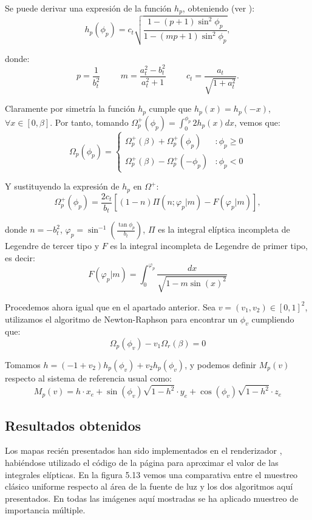 Se puede derivar una expresión de la función $h_p$, obteniendo (ver \cite{Guillen2017}):
$$h_p(\phi_p)=c_t\sqrt{\frac{1-(p+1)\sin^2\phi_p}{1-(mp+1)\sin^2\phi_p}},$$

donde:
$$p=\frac{1}{b_t^2} \hspace{1cm} m=\frac{a_t^2-b_t^2}{a_t^2+1} \hspace{1cm} c_t=\frac{a_t}{\sqrt{1+a_t^2}}.$$

Claramente por simetría la función $h_p$ cumple que $h_p(x) = h_p(-x)$, $\forall x \in [0,\beta]$. Por tanto, tomando $\Omega_p^+(\phi_p)=\int_0^{\phi_p}2h_p(x)dx$, vemos que:
\[ \Omega_p(\phi_p) =
   \begin{cases}
      \Omega_p^+(\beta)+\Omega_p^+(\phi_p) & :\phi_p\geq0 \\
      \Omega_p^+(\beta)-\Omega_p^+(-\phi_p) & :\phi_p <0
   \end{cases}
  \]

Y sustituyendo la expresión de $h_p$ en $\Omega^+$:
$$\Omega_p^+(\phi_p)=\frac{2c_t}{b_t}[(1-n)\Pi(n;\varphi_p|m)-F(\varphi_p|m)],$$

donde $n=-b_t^2$, $\varphi_p=\sin^{-1}(\frac{\tan\phi_p}{b_t})$, $\Pi$ es la integral elíptica incompleta de Legendre de tercer tipo y $F$ es la integral incompleta de Legendre de primer tipo, es decir:
$$F(\varphi_p | m) = \int_0^{\varphi_p}\frac{dx}{\sqrt{1-m\sin(x)^2}} $$

Procedemos ahora igual que en el apartado anterior. Sea $v=(v_1,v_2)\in[0,1]^2$, utilizamos el algoritmo de Newton-Raphson para encontrar un $\phi_v$ cumpliendo que:
$$\Omega_p(\phi_v)-v_1\Omega_r(\beta) = 0 $$

Tomamos $h = (-1+v_2)h_p(\phi_v) + v_2h_p(\phi_v)$, y podemos definir $M_p(v)$ respecto al sistema de referencia usual como:
$$M_p(v) = h\cdot x_e +\sin(\phi_v)\sqrt{1-h^2}\cdot y_e + \cos(\phi_v)\sqrt{1-h^2}\cdot z_e$$

\subsection{Resultados obtenidos}

Los mapas recién presentados han sido implementados en el renderizador \cite{pbrtCode}, habiéndose utilizado el código de la página \cite{codigoIntegralEliptica} para aproximar el valor de las integrales elípticas. En la figura 5.13 vemos una comparativa entre el muestreo clásico uniforme respecto al área de la fuente de luz y los dos algoritmos aquí presentados. En todas las imágenes aquí mostradas se ha aplicado muestreo de importancia múltiple.

